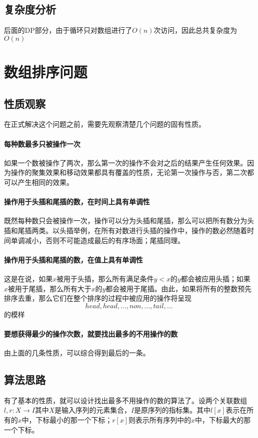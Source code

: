 \documentclass[UTF8]{ctexart}
\begin{document}
    \subsection*{复杂度分析}
        后面的DP部分，由于循环只对数组进行了$O(n)$次访问，因此总共复杂度为$O(n)$

\section{数组排序问题} %
    \subsection*{性质观察}
        在正式解决这个问题之前，需要先观察清楚几个问题的固有性质。
        
        \paragraph*{每种数最多只被操作一次}
            如果一个数被操作了两次，那么第一次的操作不会对之后的结果产生任何效果。因为操作的聚集效果和移动效果都具有覆盖的性质，无论第一次操作与否，第二次都可以产生相同的效果。

        \paragraph*{操作用于头插和尾插的数，在时间上具有单调性}
            既然每种数只会被操作一次，操作可以分为头插和尾插，那么可以把所有数分为头插和尾插两类。以头插举例，在所有对数进行头插的操作中，操作的数必然随着时间单调减小，否则不可能造成最后的有序场面；尾插同理。

        \paragraph*{操作用于头插和尾插的数，在值上具有单调性}
            这是在说，如果$x$被用于头插，那么所有满足条件$y<x$的$y$都会被应用头插；如果$x$被用于尾插，那么所有大于$x$的$y$都会被用于尾插。由此，如果将所有的整数预先排序去重，那么它们在整个排序的过程中被应用的操作将呈现
            $$head, head, \dots, non, \dots, tail, \dots$$
            的模样

        \paragraph*{要想获得最少的操作次数，就要找出最多的不用操作的数}
            由上面的几条性质，可以综合得到最后的一条。
    
    \subsection*{算法思路}
        有了基本的性质，就可以设计找出最多不用操作的数的算法了。设两个关联数组$l, r:X\to I$其中$X$是输入序列的元素集合，$I$是原序列的指标集。其中$l[x]$表示在所有的$x$中，下标最小的那一个下标；$r[x]$则表示所有序列中的$x$中，下标最大的那一个下标。
\end{document}
